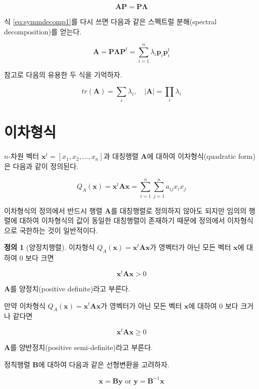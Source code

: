 \documentclass[
]{book}
\newcommand{\bm}[1]{\boldsymbol{\mathbf{#1}}}
\theoremstyle{definition}
\newtheorem{definition}{정의}[chapter]
\theoremstyle{definition}
\theoremstyle{definition}
\theoremstyle{definition}
\theoremstyle{remark}
\begin{document}
\[ \bm A \bm P = \bm P \bm \Lambda \]

식 \eqref{eq:symmdecomp1}를 다시 쓰면 다음과 같은 스펙트럴 분해(spectral decomposition)를 얻는다.

\begin{equation}
 \bm A  = \bm P \bm \Lambda \bm P^t  = \sum_{i=1}^n \lambda_i \bm p_i \bm {p}_i^t 
 \label{eq:spectral}
\end{equation}

참고로 다음의 유용한 두 식을 기억하자.

\[ tr(\bm A) = \sum_i \lambda_i ,\quad |\bm A| = \prod_i \lambda_i \]

\hypertarget{uxc774uxcc28uxd615uxc2dd-1}{%
\section{이차형식}\label{uxc774uxcc28uxd615uxc2dd-1}}

\(n\)-차원 벡터 \(\bm x^t=[x_1,x_2,\dots,x_n]\)과 대칭행렬 \(\bm A\)에 대하여 이차형식(quadratic form)은 다음과 같이 정의된다.

\begin{equation}
Q_A(\bm x) = \bm x^t \bm A \bm x =\sum_{i=1}^n \sum_{j=1}^n a_{ij} x_i x_j 
\label{eq:quadratic}
\end{equation}

이차형식의 정의에서 반드시 행렬 \(\bm A\)를 대칭행렬로 정의하지 않아도 되지만 임의의 행렬에 대하여 이차형식의 값이 동일한 대칭행렬이 존재하기 때문에 정의에서 이차형식으로 국한하는 것이 일반적이다.

\begin{definition}[양정치행렬]
\protect\hypertarget{def:unnamed-chunk-44}{}{\label{def:unnamed-chunk-44} {} }
이차형식 \(Q_A(\bm x) = \bm x^t \bm A \bm x\)가 영벡터가 아닌 모든 벡터 \(\bm x\)에 대하여 0 보다 크면

\[ \bm x^t \bm A \bm x  >0 \]

\(\bm A\)를 양정치(positive definite)라고 부른다.

만약 이차형식 \(Q_A(\bm x) = \bm x^t \bm A \bm x\)가 영벡터가 아닌 모든 벡터 \(\bm x\)에 대하여 0 보다 크거나 같다면

\[ \bm x^t \bm A \bm x  \ge 0 \]

\(\bm A\)를 양반정치(positive semi-definite)라고 부른다.
\end{definition}

정칙행렬 \(\bm B\)에 대하여 다음과 같은 선형변환을 고려하자.

\[   \bm x = \bm B \bm y \text{ or } \bm y = \bm {B}^{-1} \bm x \]
\end{document}
